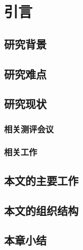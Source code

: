 \chapter{引言}
    \section{研究背景}
    \section{研究难点}
    \section{研究现状}
        \subsection{相关测评会议}
        \subsection{相关工作}
    \section{本文的主要工作}
    \section{本文的组织结构}
    \section{本章小结}
